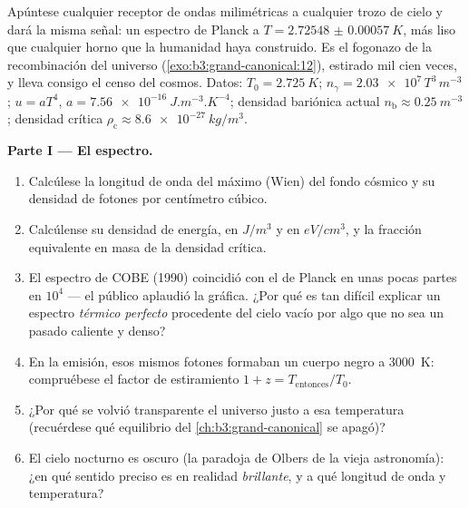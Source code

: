 \begin{problem}\label{pb:b3:photons-phonons:1}
Apúntese cualquier receptor de ondas milimétricas a cualquier trozo de cielo y
dará la misma señal: un espectro de Planck a $T =
\qty{2.72548(57)}{K}$, más liso que cualquier horno que la humanidad haya
construido. Es el fogonazo de la recombinación del universo
(\cref{exo:b3:grand-canonical:12}), estirado mil cien veces,
y lleva consigo el censo del cosmos. Datos: $T_0 =
\qty{2.725}{K}$; $n_\gamma = \num{2.03e7}\,T^3\,\unit{m^{-3}}$;
$u = aT^4$, $a = \qty{7.56e-16}{J.m^{-3}.K^{-4}}$; densidad bariónica
actual $n_{\text{b}} \approx \qty{0.25}{m^{-3}}$; densidad crítica
$\rho_{\text{c}} \approx \qty{8.6e-27}{kg/m^3}$.

\medskip\noindent\textbf{Parte I --- El espectro.}
\begin{enumerate}
  \item Calcúlese la longitud de onda del máximo (Wien) del fondo cósmico y su
        densidad de fotones por centímetro cúbico.
  \item Calcúlense su densidad de energía, en $\unit{J/m^3}$ y en
        $\unit{eV/cm^3}$, y la fracción equivalente en masa de la
        densidad crítica.
  \item El espectro de COBE (1990) coincidió con el de Planck en unas pocas partes
        en $10^4$ --- el público aplaudió la gráfica. ¿Por qué es tan difícil
        explicar un espectro \emph{térmico perfecto} procedente del cielo vacío
        por algo que no sea un pasado caliente y denso?
  \item En la emisión, esos mismos fotones formaban un cuerpo negro a
        \qty{3000}{K}: compruébese el factor de estiramiento $1 + z =
        T_{\text{entonces}}/T_0$.
  \item ¿Por qué se volvió transparente el universo justo a esa
        temperatura (recuérdese qué equilibrio del
        \cref{ch:b3:grand-canonical} se apagó)?
  \item El cielo nocturno es oscuro (la paradoja de Olbers de la vieja
        astronomía): ¿en qué sentido preciso es en realidad
        \emph{brillante}, y a qué longitud de onda y temperatura?
\end{enumerate}


\end{problem}
